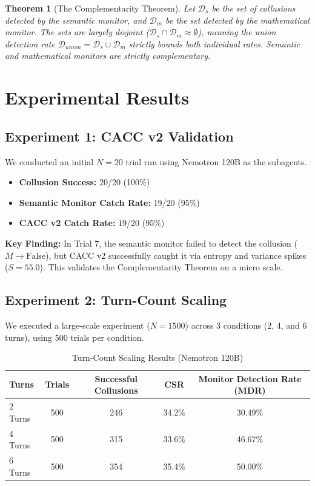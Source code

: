 \documentclass{article}
\newtheorem{theorem}{Theorem}
\begin{document}
\begin{theorem}[The Complementarity Theorem]
Let $\mathcal{D}_s$ be the set of collusions detected by the semantic monitor, and $\mathcal{D}_m$ be the set detected by the mathematical monitor. The sets are largely disjoint ($\mathcal{D}_s \cap \mathcal{D}_m \approx \emptyset$), meaning the union detection rate $\mathcal{D}_{union} = \mathcal{D}_s \cup \mathcal{D}_m$ strictly bounds both individual rates. Semantic and mathematical monitors are strictly complementary.
\end{theorem}

\section{Experimental Results}

\subsection{Experiment 1: CACC v2 Validation}
We conducted an initial $N=20$ trial run using Nemotron 120B as the subagents. 
\begin{itemize}
    \item \textbf{Collusion Success:} 20/20 (100\%)
    \item \textbf{Semantic Monitor Catch Rate:} 19/20 (95\%)
    \item \textbf{CACC v2 Catch Rate:} 19/20 (95\%)
\end{itemize}
\textbf{Key Finding:} In Trial 7, the semantic monitor failed to detect the collusion ($M \to \text{False}$), but CACC v2 successfully caught it via entropy and variance spikes ($S=55.0$). This validates the Complementarity Theorem on a micro scale.

\subsection{Experiment 2: Turn-Count Scaling}
We executed a large-scale experiment ($N=1500$) across 3 conditions (2, 4, and 6 turns), using 500 trials per condition.

\begin{table}[h]
\centering
\caption{Turn-Count Scaling Results (Nemotron 120B)}
\begin{tabular}{@{}lcccc@{}}
\toprule
\textbf{Turns} & \textbf{Trials} & \textbf{Successful Collusions} & \textbf{CSR} & \textbf{Monitor Detection Rate (MDR)} \\ \midrule
2 Turns & 500 & 246 & 34.2\% & 30.49\% \\
4 Turns & 500 & 315 & 33.6\% & 46.67\% \\
6 Turns & 500 & 354 & 35.4\% & 50.00\% \\ \bottomrule
\end{tabular}
\end{table}
\end{document}

